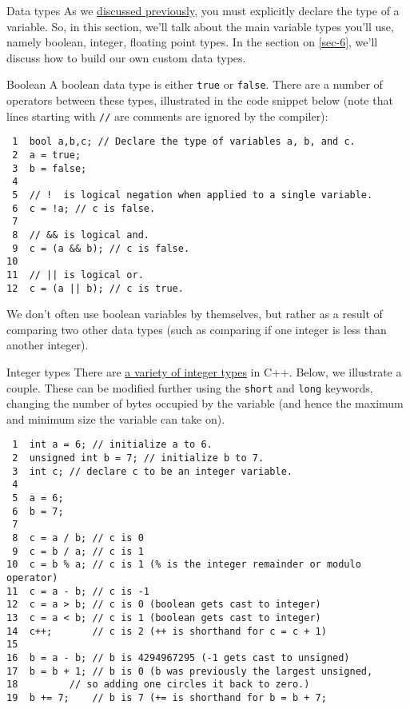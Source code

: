\documentclass[presentation]{beamer}
\begin{document}
\begin{frame}[fragile,label={sec:orgheadline3}]{Data types}
 As we \hyperlink{sec-1-1}{discussed previously}, you must explicitly declare the type of a 
variable. So, in this section, we'll talk about the main variable 
types you'll use, namely boolean, integer, floating point types. In 
the section on \ref{sec-6}, we'll discuss how to build 
our own custom data types.

\begin{block}{Boolean}
A boolean data type is either \texttt{true} or \texttt{false}. There are a number of 
operators between these types, illustrated in the code snippet below 
(note that lines starting with \texttt{//} are comments are ignored by the 
compiler):

\begin{verbatim}
 1  bool a,b,c; // Declare the type of variables a, b, and c.
 2  a = true;
 3  b = false;
 4  
 5  // !  is logical negation when applied to a single variable.
 6  c = !a; // c is false.
 7  
 8  // && is logical and.
 9  c = (a && b); // c is false.
10  
11  // || is logical or.
12  c = (a || b); // c is true.
\end{verbatim}

We don't often use boolean variables by themselves, but rather as a result 
of comparing two other data types (such as comparing if one integer is less 
than another integer).
\end{block}

\begin{block}{Integer types}
There are \href{http://en.cppreference.com/w/cpp/language/types}{a variety of integer types} in C++. Below, we illustrate a 
couple. These can be modified further using the \texttt{short} and \texttt{long} 
keywords, changing the number of bytes occupied by the variable (and 
hence the maximum and minimum size the variable can take on).

\begin{verbatim}
 1  int a = 6; // initialize a to 6.
 2  unsigned int b = 7; // initialize b to 7.
 3  int c; // declare c to be an integer variable.
 4  
 5  a = 6;
 6  b = 7;
 7  
 8  c = a / b; // c is 0
 9  c = b / a; // c is 1
10  c = b % a; // c is 1 (% is the integer remainder or modulo operator)
11  c = a - b; // c is -1
12  c = a > b; // c is 0 (boolean gets cast to integer)
13  c = a < b; // c is 1 (boolean gets cast to integer)
14  c++;       // c is 2 (++ is shorthand for c = c + 1)
15  
16  b = a - b; // b is 4294967295 (-1 gets cast to unsigned)
17  b = b + 1; // b is 0 (b was previously the largest unsigned,
18  	   // so adding one circles it back to zero.)
19  b += 7;    // b is 7 (+= is shorthand for b = b + 7;
\end{verbatim}


\end{block}
\end{frame}
\end{document}
